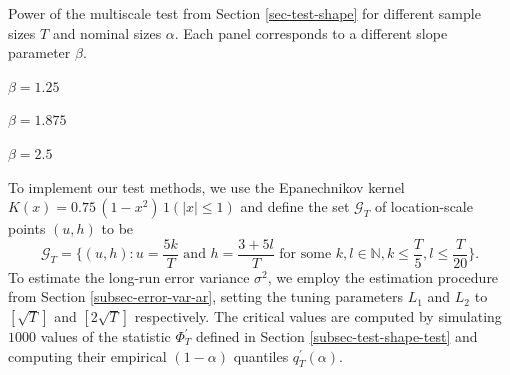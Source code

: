 \begin{table}[t]
\footnotesize{
\begin{center}
\caption{Power of the multiscale test from Section \ref{sec-test-shape} for different sample sizes $T$ and nominal sizes $\alpha$. Each panel corresponds to a different slope parameter $\beta$.}\label{tab:power_shape}
\begin{subtable}[b]{0.32\textwidth}
\centering
\caption{$\beta = 1.25$}\label{tab:power_050_ll_shape}
\renewcommand{\arraystretch}{1.2}

\end{subtable}
\begin{subtable}[b]{0.32\textwidth}
\centering
\caption{$\beta = 1.875$}\label{tab:power_075_ll_shape}
\renewcommand{\arraystretch}{1.2}

\end{subtable}
\begin{subtable}[b]{0.32\textwidth}
\centering
\caption{$\beta = 2.5$}\label{tab:power_100_ll_shape}
\renewcommand{\arraystretch}{1.2}

\end{subtable}
\end{center}}
\end{table}

To implement our test methods, we use the Epanechnikov kernel $K(x) = 0.75 \, (1 - x^2) \, 1(|x| \le 1)$ and define the set $\mathcal{G}_T$ of location-scale points $(u,h)$ to be 
\begin{equation}\label{grid-sim-app}
\mathcal{G}_T = \{(u, h): u = \frac{5k}{T} \text{ and } h = \frac{3+5l}{T} \text{ for some } k, l \in \mathbb{N}, k \le \frac{T}{5}, l \le \frac{T}{20}\}. 
\end{equation}
To estimate the long-run error variance $\sigma^2$, we employ the estimation procedure from Section \ref{subsec-error-var-ar}, setting the tuning parameters $L_1$ and $L_2$ to $[\sqrt{T}]$ and $[2\sqrt{T}]$ respectively. The critical values are computed by simulating $1000$ values of the statistic $\Phi^\prime_T$ defined in Section \ref{subsec-test-shape-test} and computing their empirical $(1-\alpha)$ quantiles $q_T^\prime(\alpha)$. 


